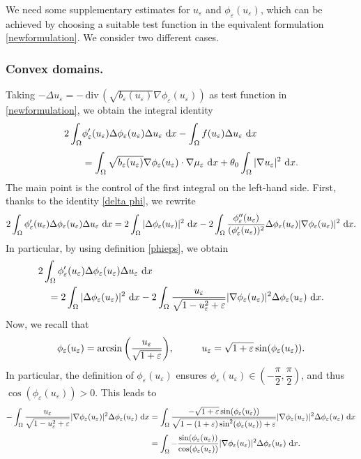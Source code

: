 \documentclass[11pt,  reqno]{amsart}%
\theoremstyle{plain}
\theoremstyle{definition}
\theoremstyle{remark}
\numberwithin{equation}{section}
\newcommand{\ve}{\varepsilon}
\def\div{\,\mathrm{div}}
\newcommand{\dx}{\textup{d}x}
\begin{document}
We need some supplementary estimates for $u_\ve$ and $\phi_\ve(u_\ve)$,
which can be achieved by choosing a suitable test function in the equivalent formulation \eqref{newformulation}.
We consider two different cases.

\subsubsection{Convex domains.}

Taking $-\Delta u_\ve = - \div\, \left( \sqrt{b_\ve(u_\ve)}\nabla \phi_\ve(u_\ve) \right)$ as test function in \eqref{newformulation}, we obtain the integral identity
\begin{align} 
		2\int_\Omega &\phi_\ve'(u_\ve) \Delta \phi_\ve(u_\ve) \Delta u_\ve \ \dx - \int_\Omega f(u_\ve) \Delta u_\ve \  \dx \notag \\[3pt]
		&= \int_\Omega \sqrt{b_\ve(u_\ve)}\nabla \phi_\ve(u_\ve) \cdot \nabla \mu_\ve \ \dx + \theta_0 \int_\Omega |\nabla u_\ve |^2 \ \dx.
\label{SE 1}
\end{align}
The main point is the control of the first integral on the left-hand side. 
First, thanks to the identity \eqref{delta phi}, we rewrite 
\begin{equation}
    \label{SE 2}
 2 \int_\Omega \phi_\ve'(u_\ve) \Delta \phi_\ve(u_\ve) \Delta u_\ve \ \dx 
 =
 2 \int_\Omega |\Delta \phi_\ve(u_\ve)|^2 \ \dx - 2 \int_\Omega \dfrac{\phi_\ve''(u_\ve)}{(\phi_\ve'(u_\ve))^2}\Delta \phi_\ve(u_\ve)|\nabla \phi_\ve(u_\ve)|^2 \ \dx.
\end{equation}
In particular, by using definition \eqref{phieps}, we obtain
 \begin{align}
&2\int_\Omega \phi_\ve'(u_\ve)\Delta \phi_\ve(u_\ve)\Delta u_\ve \ \dx  \notag
\\
&\quad = 2 \int_\Omega |\Delta \phi_\ve(u_\ve)|^2 \ \dx -2 \int_\Omega \dfrac{u_\ve}{\sqrt{1- u_\ve^2+\ve}}|\nabla \phi_\ve(u_\ve)|^2 \Delta \phi_\ve(u_\ve)\ \dx.
    \label{riscrivo}
\end{align}
Now, we recall that
$$\phi_\ve(u_\ve)= \arcsin \left( \dfrac{u_\ve}{\sqrt{1+\ve}}\right)\!, \hspace{1.0 cm} u_\ve = \sqrt{1+\ve}\sin(\phi_\ve(u_\ve)).$$
In particular, the definition of $\phi_\ve(u_\ve)$ ensures $\phi_\ve(u_\ve) \in \displaystyle \left( -\dfrac{\pi}{2}, \dfrac{\pi}{2}\right)$, and thus $\cos(\phi_\ve(u_\ve))>0$.
This leads to 
\begin{align*}
- \int_\Omega \dfrac{u_\ve}{\sqrt{1- u_\ve^2+\ve}}|\nabla \phi_\ve(u_\ve)|^2 \Delta \phi_\ve(u_\ve)\ \dx 
& = 
\int_\Omega \dfrac{-\sqrt{1+\ve}\sin(\phi_\ve(u_\ve))}{\sqrt{1- (1+\ve)\sin^2(\phi_\ve(u_\ve))+\ve}}|\nabla \phi_\ve(u_\ve)|^2 \Delta \phi_\ve(u_\ve)\ \dx
\\[3pt] 
& = 
\int_\Omega - \dfrac{\sin(\phi_\ve(u_\ve))}{\cos(\phi_\ve(u_\ve))}|\nabla \phi_\ve(u_\ve)|^2 \Delta \phi_\ve(u_\ve)\ \dx.
\end{align*}
\end{document}
